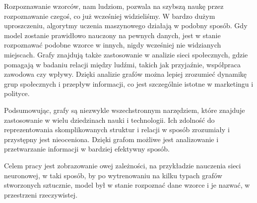 Rozpoznawanie wzorców, nam ludziom, pozwala na szybszą naukę przez rozpoznawanie czegoś, co już wcześniej widzieliśmy.
W bardzo dużym uproszczeniu, algorytmy uczenia maszynowego działają w podobny sposób.
Gdy model zostanie prawidłowo nauczony na pewnych danych, jest w stanie rozpoznawać podobne wzorce w innych,
nigdy wcześniej nie widzianych miejscach.
Grafy znajdują także zastosowanie w analizie sieci społecznych, gdzie pomagają w badaniu relacji między ludźmi,
takich jak przyjaźnie, współpraca zawodowa czy wpływy.
Dzięki analizie grafów można lepiej zrozumieć dynamikę grup społecznych i przepływ informacji,
co jest szczególnie istotne w marketingu i polityce.

Podsumowując, grafy są niezwykle wszechstronnym narzędziem, które znajduje zastosowanie w wielu dziedzinach nauki i technologii.
Ich zdolność do reprezentowania skomplikowanych struktur i relacji w sposób zrozumiały i przystępny jest nieoceniona.
Dzięki grafom możliwe jest analizowanie i przetwarzanie informacji w bardziej efektywny sposób. 

Celem pracy jest zobrazowanie owej zależności, na przykładzie nauczenia sieci neuronowej,
w taki sposób, by po wytrenowaniu na kilku typach grafów stworzonych sztucznie,
model był w stanie rozpoznać dane wzorce i je nazwać, w przestrzeni rzeczywistej.